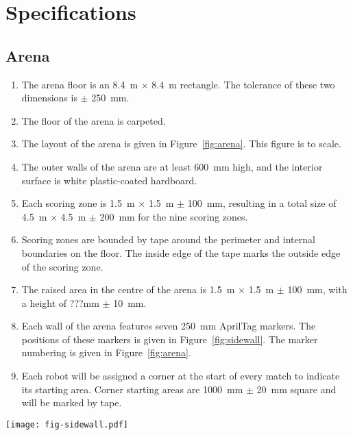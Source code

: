 \section{Specifications}
\label{sec:specs}

\subsection{Arena}
\label{spec:arena}

\begin{enumerate}
  \item The arena floor is an \SI{8.4}{m} $\times$ \SI{8.4}{m} rectangle. The
        tolerance of these two dimensions is $\pm$ \SI{250}{mm}.
  \item The floor of the arena is carpeted.
  \item The layout of the arena is given in Figure~\ref{fig:arena}. This
        figure is to scale.
  \item The outer walls of the arena are at least \SI{600}{mm} high, and the
        interior surface is white plastic-coated hardboard.
  \item Each scoring zone is \SI{1.5}{m} $\times$ \SI{1.5}{m} $\pm$ \SI{100}{mm},
        resulting in a total size of \SI{4.5}{m} $\times$ \SI{4.5}{m} $\pm$ \SI{200}{mm}
        for the nine scoring zones.
  \item Scoring zones are bounded by tape around the perimeter
        and internal boundaries on the floor. The inside edge of the tape marks the outside
        edge of the scoring zone.
  \item The raised area in the centre of the arena is \SI{1.5}{m} $\times$ \SI{1.5}{m} $\pm$ \SI{100}{mm},
        with a height of ???mm $\pm$ \SI{10}{mm}.
  \item Each wall of the arena features seven \SI{250}{mm} AprilTag markers.
        The positions of these markers is given in Figure~\ref{fig:sidewall}.
        The marker numbering is given in Figure~\ref{fig:arena}.
  \item Each robot will be assigned a corner at the start of every match to indicate its starting area.
        Corner starting areas are \SI{1000}{mm} $\pm$ \SI{20}{mm} square and will be marked by tape.
\end{enumerate}


\begin{sidewaysfigure}
  \texttt{[image: fig-sidewall.pdf]}
  \caption{Layout of markers along each arena wall.}
  \label{fig:sidewall}
\end{sidewaysfigure}


